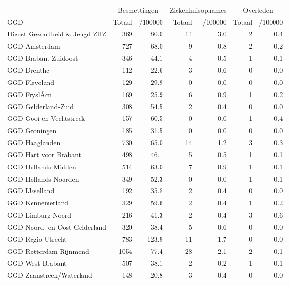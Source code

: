 \documentclass[
  english,
  man,floatsintext]{apa6}
\begin{document}
\begin{table}
\centering\begingroup\fontsize{10}{12}\selectfont

\begin{threeparttable}
\begin{tabular}{lrrrrrr}
\toprule
\multicolumn{1}{c}{ } & \multicolumn{2}{c}{Besmettingen} & \multicolumn{2}{c}{Ziekenhuisopnames} & \multicolumn{2}{c}{Overleden} \\
\cmidrule(l{3pt}r{3pt}){2-3} \cmidrule(l{3pt}r{3pt}){4-5} \cmidrule(l{3pt}r{3pt}){6-7}
GGD & Totaal & /100000 & Totaal & /100000 & Totaal & /100000\\
\midrule
Dienst Gezondheid \& Jeugd ZHZ & 369 & 80.0 & 14 & 3.0 & 2 & 0.4\\
GGD Amsterdam & 727 & 68.0 & 9 & 0.8 & 2 & 0.2\\
GGD Brabant-Zuidoost & 346 & 44.1 & 4 & 0.5 & 1 & 0.1\\
GGD Drenthe & 112 & 22.6 & 3 & 0.6 & 0 & 0.0\\
GGD Flevoland & 129 & 29.9 & 0 & 0.0 & 0 & 0.0\\
GGD FryslÃ¢n & 169 & 25.9 & 6 & 0.9 & 1 & 0.2\\
GGD Gelderland-Zuid & 308 & 54.5 & 2 & 0.4 & 0 & 0.0\\
GGD Gooi en Vechtstreek & 157 & 60.5 & 0 & 0.0 & 1 & 0.4\\
GGD Groningen & 185 & 31.5 & 0 & 0.0 & 0 & 0.0\\
GGD Haaglanden & 730 & 65.0 & 14 & 1.2 & 3 & 0.3\\
GGD Hart voor Brabant & 498 & 46.1 & 5 & 0.5 & 1 & 0.1\\
GGD Hollands-Midden & 514 & 63.0 & 7 & 0.9 & 1 & 0.1\\
GGD Hollands-Noorden & 349 & 52.3 & 0 & 0.0 & 1 & 0.1\\
GGD IJsselland & 192 & 35.8 & 2 & 0.4 & 0 & 0.0\\
GGD Kennemerland & 329 & 59.6 & 2 & 0.4 & 1 & 0.2\\
GGD Limburg-Noord & 216 & 41.3 & 2 & 0.4 & 3 & 0.6\\
GGD Noord- en Oost-Gelderland & 320 & 38.4 & 5 & 0.6 & 0 & 0.0\\
GGD Regio Utrecht & 783 & 123.9 & 11 & 1.7 & 0 & 0.0\\
GGD Rotterdam-Rijnmond & 1054 & 77.4 & 28 & 2.1 & 2 & 0.1\\
GGD West-Brabant & 507 & 38.1 & 2 & 0.2 & 1 & 0.1\\
GGD Zaanstreek/Waterland & 148 & 20.8 & 3 & 0.4 & 0 & 0.0\\

\end{tabular}
\end{threeparttable}
\end{table}
\end{document}
